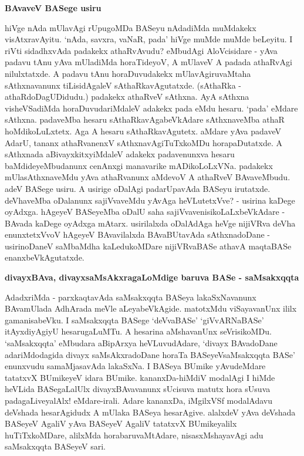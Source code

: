{\bigskip
\noindent
{\large\bf BAvaveV BASege usiru}}\label{page9}
\medskip

\noindent
hiVge nAda mUlavAgi rUpugoMDa BASeyu nAdadiMda muMdakekx visAtxravAyitu. `nAda, savxra, vaNaR, pada' hiVge muMde muMde beLeyitu. I riVti sidadhxvAda padakekx athaRvAvudu? eMbu\-dAgi AloVcisidare - yAva padavu tAnu yAva mUladiMda horaTideyoV, A mUlaveV A padada athaRvAgi nilulxtatxde. A padavu tAnu horaDuvudakekx mUlavAgiruvaMtaha sAthxnavanunx tiLisi\-dAgaleV sAthaRkavAgutatxde. (sAthaRka - athaRdoDagUDidudu.) padakekx athaRveV sAthxna. AyA sAthxna visheVSa\-diMda horaDuvudariMdaleV adakekx pada eMdu hesaru. `pada' eMdare sAthxna. pada\-veMba hesaru sAthaRkavAgabeVkAdare sAthxnaveMba athaR hoMdikoLuLxtetx. Aga A hesaru sAthaRkavAgutetx. aMdare yAva padaveV AdarU, tananx athaRvanenxV sAthxnavAgiTuTxkoMDu horapaDutatxde. A sAthxnada aBivayxkitx\-yiMdaleV adakekx padavenunxva hesaru baMdideyeMbudanunx cenAnxgi manavarike mADikoLoLxVNa. padakekx mUlasAthxnaveMdu yAva athaRvanunx aMdevoV A athaRveV BAvaveMbudu. adeV BASege usiru. A usirige oDalAgi padarUpavAda BASeyu irutatxde. deVha\-veMba oDa\-lanunx sajiVva\-veMdu yAvAga\- heVLutetxVve? - usirina kaDege oyAdxga. hAgeyeV BASeyeMba oDalU saha sajiVva\-venisi\-koLaLxbeVkAdare - BAvada kaDege oyAdxga mAtarx. usirilalxda oDalAdAga heVge nijiVRva deVha enunx\-tetxVvoV hAgeyeV BAvavilalxda BAvaBUtavAda sAthxnadoDane - usirinoDaneV saMbaMdha kaLedu\-koMDare nijiVRvaBASe athavA maqtaBASe enanxbeVkAgutatxde.

{\bigskip
\noindent
{\large\bf divayxBAva, divayxsaMsAkxragaLoMdige baruva BASe - saMsakxqqta}}\label{page10}
\medskip

\noindent
AdadxriMda - parxkaqtavAda saMsakxqqta BASeya lakaSxNavanunx BAvamUlada AdhArada meVle aLeya\-beVkAgide. matotxMdu viSayavanUnx ililx gamanisabeVku. I \hbox{saMsakxqqta} BASege `deVvaBASe' `giVvARNa\-BASe' itAyxdi\-yAgiyU hesarugaLuMTu. A hesarina aMshavanUnx seVrisikoMDu. `saMsakxqqta' eMbu\-dara aBi\-pArxya heVLuvudAdare, `divayx BAvadoDane adariMdodagida divayx saMsAkxradoDane horaTa BASeyeV\-saMsakxqqta BASe' enunxvudu samaMjasavAda lakaSxNa. I BASeya BUmike yAvudeMdare tatatxvX BUmikeyeV idara BUmike. kananxDa-hiMdiV modalAgi I hiMde heVLida BASegaLalUlx divayxBAva\-vanunx sUci\-suva matutx hora sUsuva padagaLive\-yalAlx! eMdare-irali. Adare kananxDa, iMgilxVSf modalAdavu deVshada\- hesarAgidudx A mUlaka BASeya hesarAgive. alalxdeV yAva deVshada BASeyeV AgaliV yAva BASeyeV AgaliV tatatxvX BUmikeyalilx huTiTxkoMDare, alilxMda horabaruvaMtA\-dare, nisasxMshaya\-vAgi adu saMsakxqqta BASeyeV sari.

